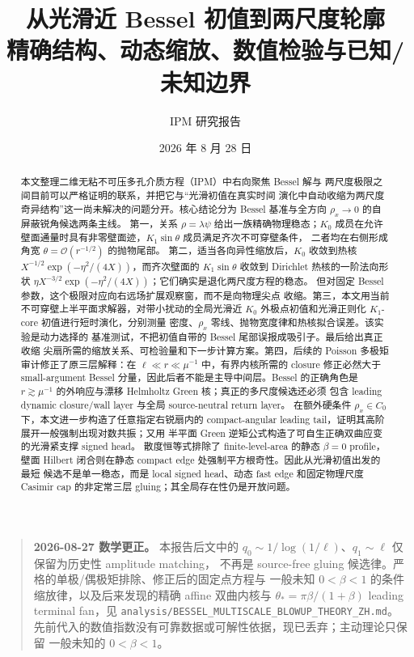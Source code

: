 \documentclass[11pt,a4paper,fontset=fandol]{ctexart}
\title{\bfseries 从光滑近 Bessel 初值到两尺度轮廓\\
\large 精确结构、动态缩放、数值检验与已知/未知边界}
\author{IPM 研究报告}
\date{2026 年 8 月 28 日}
\newcommand{\Order}{\mathcal O}
\begin{document}
\maketitle

\begin{abstract}
本文整理二维无粘不可压多孔介质方程（IPM）中右向聚焦 Bessel 解与
两尺度极限之间目前可以严格证明的联系，并把它与“光滑初值在真实时间
演化中自动收缩为两尺度奇异结构”这一尚未解决的问题分开。核心结论分为
Bessel 基准与全方向 $\rho_x\to0$ 的自屏蔽锐角候选两条主线。
第一，关系 $\rho=\lambda\psi$ 给出一族精确物理稳态；$K_0$ 成员在允许
壁面通量时具有非零壁面迹，$K_1\sin\theta$ 成员满足齐次不可穿壁条件，
二者均在右侧形成角宽 $\theta=\Order(r^{-1/2})$ 的抛物尾部。
第二，适当各向异性缩放后，$K_0$ 收敛到热核
$X^{-1/2}\exp(-\eta^2/(4X))$，而齐次壁面的 $K_1\sin\theta$ 收敛到
Dirichlet 热核的一阶法向形状
$\eta X^{-3/2}\exp(-\eta^2/(4X))$；它们确实是退化两尺度方程的稳态。
但对固定 Bessel 参数，这个极限对应向右远场扩展观察窗，而不是向物理尖点
收缩。第三，本文用当前不可穿壁上半平面求解器，对带小扰动的全局光滑近
$K_0$ 外极点初值和光滑正则化 $K_1$-core 初值进行短时演化，分别测量
密度、$\rho_x$ 零线、抛物宽度律和热核拟合误差。该实验是动力选择的
基准测试，不把初值自带的 Bessel 尾部误报成吸引子。最后给出真正收缩
尖扇所需的缩放关系、可检验量和下一步计算方案。第四，后续的 Poisson
多极矩审计修正了原三层解释：在
$\ell\ll r\ll\mu^{-1}$ 中，有界内核所需的 closure 修正必然大于
small-argument Bessel 分量，因此后者不能是主导中间层。Bessel 的正确角色是
$r\gtrsim\mu^{-1}$ 的外响应与漂移 Helmholtz Green 核；真正的多尺度候选还必须
包含 leading dynamic closure/wall layer 与全局 source-neutral return layer。
在额外硬条件 $\rho_x\in C_0$ 下，本文进一步构造了任意指定右锐扇内的
compact-angular leading tail，证明其高阶展开一般强制出现对数共振；又用
半平面 Green 逆矩公式构造了可自生正确双曲应变的光滑紧支撑 signed head。
散度恒等式排除了 finite-level-area 的静态 $\beta=0$ profile，壁面 Hilbert
闭合则在静态 compact edge 处强制平方根奇性。因此从光滑初值出发的最短
候选不是单一稳态，而是 local signed head、动态 fast edge 和固定物理尺度
Casimir cap 的非定常三层 gluing；其全局存在性仍是开放问题。
\end{abstract}

\begin{quote}
\textbf{2026-08-27 数学更正。}
本报告后文中的
$q_0\sim1/\log(1/\ell)$、$q_1\sim\ell$ 仅保留为历史性 amplitude matching，
不再是 source-free gluing 候选律。严格的单极/偶极矩排除、修正后的固定点方程与
一般未知 $0<\beta<1$ 的条件缩放律，以及后来发现的精确 affine 双曲内核与
$\theta_*=\pi\beta/(1+\beta)$ leading terminal fan，见
\texttt{analysis/BESSEL\_MULTISCALE\_BLOWUP\_THEORY\_ZH.md}。
先前代入的数值指数没有可靠数据或可解性依据，现已丢弃；主动理论只保留
一般未知的 $0<\beta<1$。
\end{quote}
\end{document}

